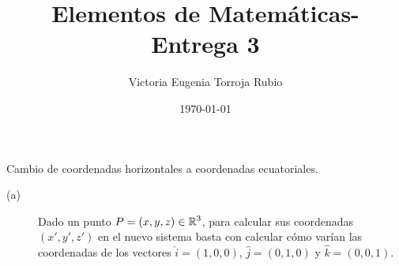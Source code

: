\documentclass{article}
\begin{document}
\title{Elementos de Matemáticas- Entrega 3}
\author{Victoria Eugenia Torroja Rubio}
\date{\today}

\maketitle

\begin{ej}
Cambio de coordenadas horizontales a coordenadas ecuatoriales.
\end{ej}

\begin{sol}
\begin{description}
	\item[(a)] Dado un punto $\displaystyle P = \left(x,y,z\right) \in \mathbb{R}^{3} $, para calcular sus coordenadas $\displaystyle \left(x', y', z'\right) $ en el nuevo sistema basta con calcular cómo varían las coordenadas de los vectores $\displaystyle \hat{i}= \left(1,0,0\right) $, $\displaystyle \hat{j} = \left(0,1,0\right)$ y $\displaystyle \hat{k} = \left(0,0,1\right)$.
\end{description}

\end{sol}
\end{document}
